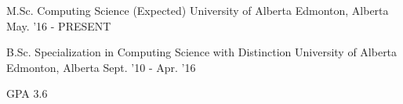 
\begin{cventries}
    \cventry
        {M.Sc. Computing Science (Expected)} %
        {University of Alberta} %
        {Edmonton, Alberta} %
        {May. '16 - PRESENT} %
        {
            \begin{cvitems}
            \end{cvitems}
        }
    \cventry
        {B.Sc. Specialization in Computing Science with Distinction} %
        {University of Alberta} %
        {Edmonton, Alberta} %
        {Sept. '10 - Apr. '16} %
        {
            \begin{cvitems}
                \item GPA 3.6
            \end{cvitems}
        }
\end{cventries}
